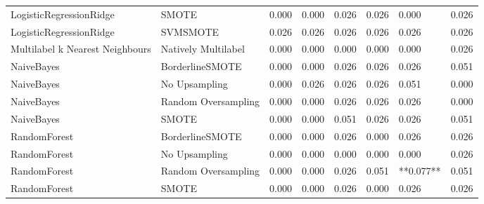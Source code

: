 \begin{tabular}{llllllll}
        LogisticRegressionRidge &                         SMOTE & 0.000 &                     0.000 &                 0.026 &                  0.026 &                                   0.000 &    0.026 \\
        LogisticRegressionRidge &                      SVMSMOTE & 0.026 &                     0.026 &                 0.026 &                  0.026 &                                   0.026 &    0.026 \\
Multilabel k Nearest Neighbours &           Natively Multilabel & 0.000 &                     0.000 &                 0.000 &                  0.000 &                                   0.000 &    0.026 \\
                     NaiveBayes &               BorderlineSMOTE & 0.000 &                     0.000 &                 0.026 &                  0.026 &                                   0.026 &    0.051 \\
                     NaiveBayes &                 No Upsampling & 0.000 &                     0.026 &                 0.026 &                  0.026 &                                   0.051 &    0.000 \\
                     NaiveBayes &           Random Oversampling & 0.000 &                     0.000 &                 0.026 &                  0.026 &                                   0.026 &    0.000 \\
                     NaiveBayes &                         SMOTE & 0.000 &                     0.000 &                 0.051 &                  0.026 &                                   0.026 &    0.051 \\
                   RandomForest &               BorderlineSMOTE & 0.000 &                     0.000 &                 0.026 &                  0.000 &                                   0.026 &    0.026 \\
                   RandomForest &                 No Upsampling & 0.000 &                     0.000 &                 0.000 &                  0.000 &                                   0.000 &    0.026 \\
                   RandomForest &           Random Oversampling & 0.000 &                     0.000 &                 0.026 &                  0.051 &                               **0.077** &    0.051 \\
                   RandomForest &                         SMOTE & 0.000 &                     0.000 &                 0.026 &                  0.000 &                                   0.026 &    0.026 \\

\end{tabular}
